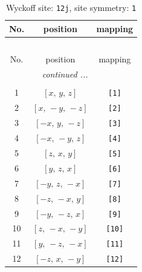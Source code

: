 \documentclass[fleqn,8pt]{jsarticle}
\begin{document}
\begin{longtable}{ccc}
\caption{Wyckoff site: {\tt 12j}, site symmetry: {\tt 1}}
 \\
 \hline \hline
No. & position & mapping \\ \hline \endfirsthead

\multicolumn{2}{l}{\tablename\ \thetable{}} \\
 \hline \hline
No. & position & mapping \\ \hline \endhead

 \hline \hline
\multicolumn{2}{r}{\footnotesize\it continued ...} \\ \endfoot

 \hline \hline
\multicolumn{2}{r}{} \\ \endlastfoot

1 & $\left[ x,\, y,\, z \right]$ & {\tt [1]} \\ \hline
2 & $\left[ x,\, - y,\, - z \right]$ & {\tt [2]} \\ \hline
3 & $\left[ - x,\, y,\, - z \right]$ & {\tt [3]} \\ \hline
4 & $\left[ - x,\, - y,\, z \right]$ & {\tt [4]} \\ \hline
5 & $\left[ z,\, x,\, y \right]$ & {\tt [5]} \\ \hline
6 & $\left[ y,\, z,\, x \right]$ & {\tt [6]} \\ \hline
7 & $\left[ - y,\, z,\, - x \right]$ & {\tt [7]} \\ \hline
8 & $\left[ - z,\, - x,\, y \right]$ & {\tt [8]} \\ \hline
9 & $\left[ - y,\, - z,\, x \right]$ & {\tt [9]} \\ \hline
10 & $\left[ z,\, - x,\, - y \right]$ & {\tt [10]} \\ \hline
11 & $\left[ y,\, - z,\, - x \right]$ & {\tt [11]} \\ \hline
12 & $\left[ - z,\, x,\, - y \right]$ & {\tt [12]} \\
\end{longtable}
\end{document}
